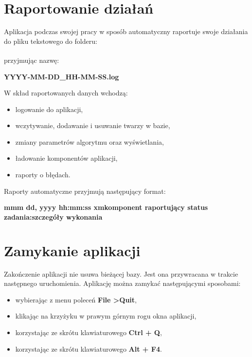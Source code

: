 \documentclass[]{article}
\begin{document}
\section[Logowanie]{Raportowanie działań}
Aplikacja podczas swojej pracy w sposób automatyczny raportuje swoje działania do pliku tekstowego do folderu:\\
\\przyjmując nazwę:\newline
\begin{center}
\textbf{\lbrack YYYY-MM-DD\_HH-MM-SS\rbrack.log}\newline\end{center}
W skład raportowanych danych wchodzą:
\begin{itemize}
	\item logowanie do aplikacji,
	\item wczytywanie, dodawanie i usuwanie twarzy w bazie,
	\item zmiany parametrów algorytmu oraz wyświetlania,
	\item ładowanie komponentów aplikacji,
	\item raporty o błędach.
\end{itemize}
Raporty automatyczne przyjmują następujący format:
\begin{flushleft}
\textbf{\lbrack mmm dd, yyyy hh:mm:ss xm\rbrack\space\lbrack komponent raportujący\rbrack\newline
\lbrack status zadania\rbrack:\lbrack szczegóły wykonania\rbrack}
\end{flushleft}



\section[Zamykanie]{Zamykanie aplikacji}
Zakończenie aplikacji nie usuwa bieżącej bazy. Jest ona przywracana w trakcie następnego uruchomienia. Aplikację można zamykać następującymi sposobami:
\begin{itemize}
	\item wybierając z menu poleceń \textbf{File \textgreater \space Quit},
	\item klikając na krzyżyku w prawym górnym rogu okna aplikacji,
	\item korzystając ze skrótu klawiaturowego \textbf{Ctrl + Q},
	\item korzystając ze skrótu klawiaturowego \textbf{Alt + F4}.
\end{itemize}

\newpage
\tableofcontents
\end{document}
